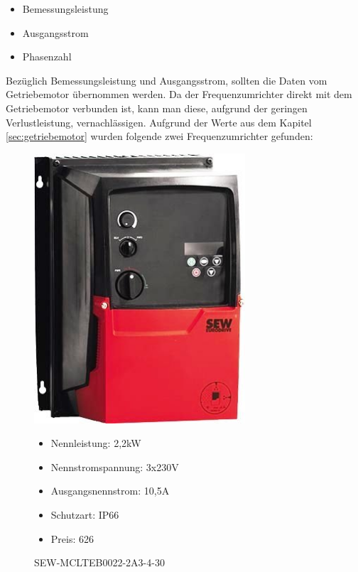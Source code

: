 \begin{itemize}
	\item{Bemessungsleistung}
	\item{Ausgangsstrom}
	\item{Phasenzahl}
\end{itemize}

Bezüglich Bemessungsleistung und Ausgangsstrom, sollten die Daten vom Getriebemotor übernommen werden. Da der Frequenzumrichter direkt mit dem Getriebemotor verbunden ist, kann man diese, aufgrund der geringen Verlustleistung, vernachlässigen. Aufgrund der Werte aus dem Kapitel \ref{sec:getriebemotor} wurden folgende zwei Frequenzumrichter gefunden:

\begin{figure}
\begin{minipage}[t]{0.45\textwidth}
\includegraphics[width=0.70\textwidth]{SEWFU}
\caption{SEW-MCLTEB0022-2A3-4-30}

\begin{itemize}
	\item{Nennleistung: 2,2kW}
	\item{Nennstromspannung: 3x230V}
	\item{Ausgangsnennstrom: 10,5A}
	\item{Schutzart: IP66}
	\item{Preis: 626\textsf{\texteuro}}
\end{itemize}


\end{minipage}
\end{figure}
